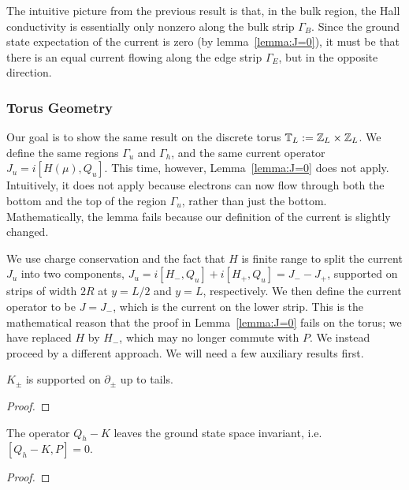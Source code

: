 \documentclass[12pt, letterpaper]{article}
\begin{document}
The intuitive picture from the previous result is that, in the bulk region, the Hall conductivity is essentially only nonzero along  the bulk strip $\Gamma_B$. Since the ground state expectation of the current is zero (by lemma~\ref{lemma:J=0}), it must be that there is an equal current flowing along the edge strip $\Gamma_E$, but in the opposite direction.

\subsubsection{Torus Geometry}

Our goal is to show the same result on the discrete torus $\mathbb{T}_L := \mathbb{Z}_L \times \mathbb{Z}_L$. We define the same regions $\Gamma_u$ and $\Gamma_h$, and the same current operator $J_u = i[H(\mu), Q_u]$. This time, however, Lemma~\ref{lemma:J=0} does not apply. Intuitively, it does not apply because electrons can now flow through both the bottom and the top of the region $\Gamma_u$, rather than just the bottom. Mathematically, the lemma fails because our definition of the current is slightly changed.

We use charge conservation and the fact that $H$ is finite range to split the current $J_u$ into two components, $J_u = i[H_-, Q_u] + i[H_+, Q_u] = J_- - J_+$, supported on strips of width $2R$ at $y=L/2$ and $y=L$, respectively. We then define the current operator to be $J=J_-$, which is the current on the lower strip. This is the mathematical reason that the proof in Lemma~\ref{lemma:J=0} fails on the torus; we have replaced $H$ by $H_-$, which may no longer commute with $P$. We instead proceed by a different approach. We will need a few auxiliary results first.

\begin{lemma}
$K_\pm$ is supported on $\partial_\pm$ up to tails.
\label{SupportOfK}
\end{lemma}
\begin{proof}

\end{proof}

\begin{proposition}
The operator $Q_h-K$ leaves the ground state space invariant, i.e. $[Q_h-K, P] = 0$.
\end{proposition}
\begin{proof}

\end{proof}
\end{document}
